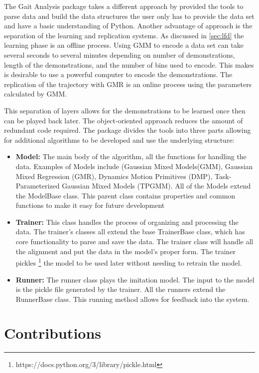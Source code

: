 The Gait Analysis package takes a different approach by provided the tools to parse data and build the data structures the user only has to provide the data set and have a basic understanding of Python. Another advantage of approach is the separation of the learning and replication systems. As discussed in \autoref{sec:lfd} the learning phase is an offline process. Using GMM to encode a data set can take several seconds to several minutes depending on number of demonstrations, length of the demonstrations, and the number of bins used to encode. This makes is desirable to use a powerful computer to encode the demonstrations. The replication of the trajectory with GMR is an online process using the parameters calculated by GMM. 

This separation of layers allows for the demonstrations to be learned once then can be played back later. The object-oriented approach reduces the amount of redundant code required. The package divides the tools into three parts allowing for additional algorithms to be developed and use the underlying structure: 

\begin{itemize}[noitemsep]
    \item \textbf{Model:} The main body of the algorithm, all the functions for handling the data. Examples of Models include (Gaussian Mixed Models(GMM), Gaussian Mixed Regression (GMR), Dynamics Motion Primitives (DMP), Task-Parameterized Gaussian Mixed Models (TPGMM). All of the Models extend the ModelBase class. This parent class contains properties and common functions to make it easy for future development
    \item \textbf{Trainer:} This class handles the process of organizing and processing the data. The trainer's classes all extend the base TrainerBase class, which has core functionality to parse and save the data. The trainer class will handle all the alignment and put the data in the model's proper form. The trainer pickles \footnote{https://docs.python.org/3/library/pickle.html} the model to be used later without needing to retrain the model. 
    \item \textbf{Runner:} The runner class plays the imitation model. The input to the model is the pickle file generated by the trainer. All the runners extend the RunnerBase class. This running method allows for feedback into the system. 
\end{itemize}


\section{Contributions}

